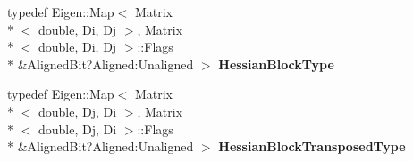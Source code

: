 \begin{DoxyCompactItemize}
\item 
\hypertarget{classg2o_1_1BaseBinaryEdge_a7eadbbe6abffe4d2ebdf6231272789a5}{typedef Eigen\-::\-Map$<$ Matrix\\*
$<$ double, Di, Dj $>$, Matrix\\*
$<$ double, Di, Dj $>$\-::Flags \\*
\&Aligned\-Bit?Aligned\-:\-Unaligned $>$ {\bfseries Hessian\-Block\-Type}}\label{classg2o_1_1BaseBinaryEdge_a7eadbbe6abffe4d2ebdf6231272789a5}

\item 
\hypertarget{classg2o_1_1BaseBinaryEdge_aec0d5b1819f702b7658574fcd6324b49}{typedef Eigen\-::\-Map$<$ Matrix\\*
$<$ double, Dj, Di $>$, Matrix\\*
$<$ double, Dj, Di $>$\-::Flags \\*
\&Aligned\-Bit?Aligned\-:\-Unaligned $>$ {\bfseries Hessian\-Block\-Transposed\-Type}}\label{classg2o_1_1BaseBinaryEdge_aec0d5b1819f702b7658574fcd6324b49}

\end{DoxyCompactItemize}
